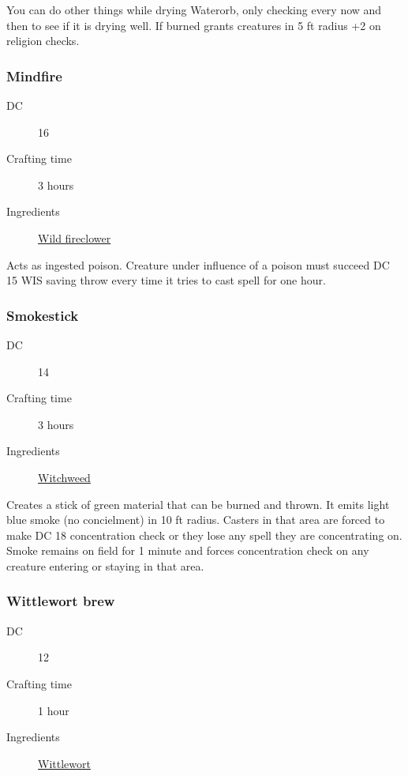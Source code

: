You can do other things while drying Waterorb, only checking every now and then to see if it is drying well.
 If burned grants creatures in 5 ft radius +2 on religion checks.

\subsubsection{Mindfire}
\label{Mindfire}

\begin{description}
\item [DC] 16
\item [Crafting time] 3 hours
\item [Ingredients] \hyperref[Wild Fireclover]{Wild fireclower}
\end{description}

Acts as ingested poison. Creature under influence of a poison must succeed DC 15 WIS 
saving throw every time it tries to cast spell for one hour.

\subsubsection{Smokestick}

\begin{description}
\item [DC] 14
\item [Crafting time] 3 hours
\item [Ingredients] \hyperref[Witchweed]{Witchweed}
\end{description}

Creates a stick of green material that can be burned and thrown. It emits light blue smoke 
(no concielment) in 10 ft radius. Casters in that area are forced to make DC 18 concentration check 
or they lose any spell they are concentrating on. 
Smoke remains on field for 1 minute and forces concentration check on any creature entering or staying in that area.

\subsubsection{Wittlewort brew}
\label{Wittlewort brew}

\begin{description}
\item [DC] 12
\item [Crafting time] 1 hour
\item [Ingredients] \hyperref[Wittlewort]{Wittlewort}
\end{description}


